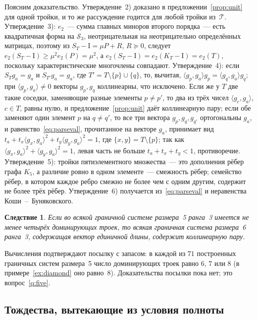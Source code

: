 \documentclass[11pt,a4paper]{article}
\theoremstyle{plain}
\newtheorem{corollary}[theorem]{Следствие}
\theoremstyle{definition}
\theoremstyle{remark}
\newcommand{\Id}{\mathrm{I}}
\newcommand{\Sk}{\mathcal{S}}
\begin{document}
Поясним доказательство. Утверждение~2) доказано в предложении~\ref{prop:unit}
для одной тройки, и то же рассуждение годится для любой тройки
из~$\mathcal T$. Утверждение~3): $e_2$~--- сумма главных миноров второго
порядка~--- есть квадратичная форма на $\Sk_3$, неотрицательная на
неотрицательно определённых матрицах, поэтому из
$S_T-\Id=\mu P+R$, $R\succeq0$, следует $e_2(S_T-\Id)\ge\mu^2e_2(P)=\mu^2$, а
$e_2(S_T-\Id)=e_2(K_T-\Id)=e_2(T)$, поскольку характеристические многочлены
совпадают. Утверждение~4): если $S_Tg_a=g_a$ и $S_{T'}g_a=g_a$, где
$T'=T\setminus\{p\}\cup\{q\}$, то, вычитая,
$\langle g_p,g_a\rangle g_p=\langle g_q,g_a\rangle g_q$; при
$\langle g_p,g_a\rangle\ne0$ векторы $g_p,g_q$ коллинеарны, что исключено.
Если же у $T$ две такие соседки, заменяющие разные элементы $p\ne p'$, то
два из трёх чисел $\langle g_c,g_a\rangle$, $c\in T$, равны нулю, и
предложение~\ref{prop:unit} даёт коллинеарную пару; если обе заменяют один
элемент $p$ на $q\ne q'$, то все три вектора $g_p,g_q,g_{q'}$ ортогональны
$g_a$, и равенство~\eqref{eq:parseval}, прочитанное на векторе $g_a$,
принимает вид $t_a+t_x\langle g_x,g_a\rangle^2+t_y\langle g_y,g_a\rangle^2=1$,
где $\{x,y\}=T\setminus\{p\}$; так как
$\langle g_x,g_a\rangle^2+\langle g_y,g_a\rangle^2=1$, левая часть не больше
$t_a+t_x+t_y<1$, противоречие. Утверждение~5): тройки пятиэлементного
множества~--- это дополнения рёбер графа $K_5$, а различие ровно в одном
элементе~--- смежность рёбер; семейство рёбер, в котором каждое ребро смежно
не более чем с одним другим, содержит не более трёх рёбер.
Утверждение~6) получается из~\eqref{eq:parseval} и неравенства
Коши~--~Буняковского.

\begin{corollary}\label{cor:five}
Если во всякой граничной системе размера~5 ранга~3 имеется не менее четырёх
доминирующих троек, то всякая граничная система размера~6 ранга~3,
содержащая вектор единичной длины, содержит коллинеарную пару.
\end{corollary}

Вычисления подтверждают посылку с запасом: в каждой из $71$ построенных
граничных систем размера~5 число доминирующих троек равно $6$, $7$ или $8$
(в примере~\ref{ex:diamond} оно равно~8). Доказательства посылки пока нет;
это вопрос~\ref{q:five}.

\subsection{Тождества, вытекающие из условия полноты}\label{sub:identities}
\end{document}
